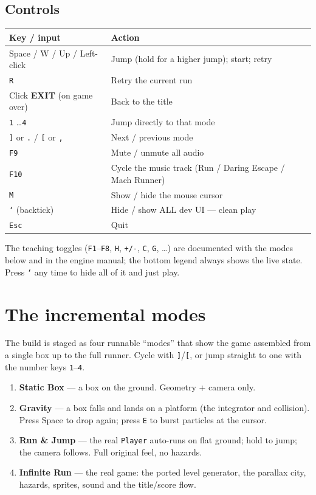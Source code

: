 \documentclass[11pt]{report}
\newcommand{\code}[1]{\texttt{#1}}
\begin{document}
\section{Controls}
\begin{longtable}{ll}
\toprule
Key / input & Action \\
\midrule
\endhead
Space / W / Up / Left-click & Jump (hold for a higher jump); start; retry \\
\code{R} & Retry the current run \\
Click \textbf{EXIT} (on game over) & Back to the title \\
\code{1} \dots \code{4} & Jump directly to that mode \\
\code{]} or \code{.} \;/\; \code{[} or \code{,} & Next / previous mode \\
\code{F9} & Mute / unmute all audio \\
\code{F10} & Cycle the music track (Run / Daring Escape / Mach Runner) \\
\code{M} & Show / hide the mouse cursor \\
\code{`} (backtick) & Hide / show ALL dev UI --- clean play \\
\code{Esc} & Quit \\
\bottomrule
\end{longtable}
The teaching toggles (\code{F1}--\code{F8}, \code{H}, \code{+/-}, \code{C}, \code{G},
\dots) are documented with the modes below and in the engine manual; the bottom
legend always shows the live state. Press \code{`} any time to hide all of it and
just play.

\chapter{The incremental modes}
The build is staged as four runnable ``modes'' that show the game assembled from a
single box up to the full runner. Cycle with \code{]}/\code{[}, or jump straight to
one with the number keys \code{1}--\code{4}.
\begin{enumerate}[nosep]
  \item \textbf{Static Box} --- a box on the ground. Geometry + camera only.
  \item \textbf{Gravity} --- a box falls and lands on a platform (the integrator
        and collision). Press Space to drop again; press \code{E} to burst
        particles at the cursor.
  \item \textbf{Run \& Jump} --- the real \code{Player} auto-runs on flat ground;
        hold to jump; the camera follows. Full original feel, no hazards.
  \item \textbf{Infinite Run} --- the real game: the ported level generator, the
        parallax city, hazards, sprites, sound and the title/score flow.
\end{enumerate}
\end{document}
